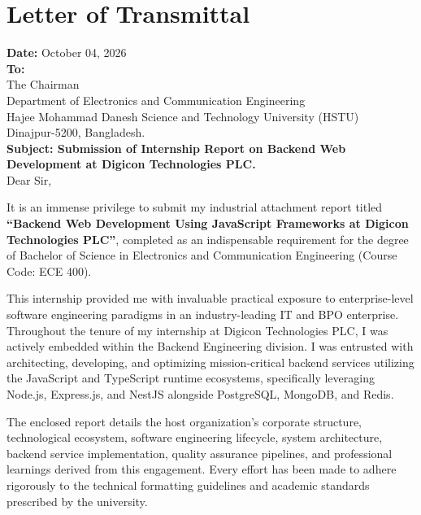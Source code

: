 \chapter*{Letter of Transmittal}

\vspace{0.5cm}
\noindent
\textbf{Date:} October 04, 2026 \\
\textbf{To:} \\
The Chairman \\
Department of Electronics and Communication Engineering \\
Hajee Mohammad Danesh Science and Technology University (HSTU) \\
Dinajpur-5200, Bangladesh. \\

\vspace{0.5cm}
\noindent
\textbf{Subject: Submission of Internship Report on Backend Web Development at Digicon Technologies PLC.} \\

\vspace{0.4cm}
\noindent
Dear Sir,

\vspace{0.2cm}
It is an immense privilege to submit my industrial attachment report titled \textbf{“Backend Web Development Using JavaScript Frameworks at Digicon Technologies PLC”}, completed as an indispensable requirement for the degree of Bachelor of Science in Electronics and Communication Engineering (Course Code: ECE 400).

This internship provided me with invaluable practical exposure to enterprise-level software engineering paradigms in an industry-leading IT and BPO enterprise. Throughout the tenure of my internship at Digicon Technologies PLC, I was actively embedded within the Backend Engineering division. I was entrusted with architecting, developing, and optimizing mission-critical backend services utilizing the JavaScript and TypeScript runtime ecosystems, specifically leveraging Node.js, Express.js, and NestJS alongside PostgreSQL, MongoDB, and Redis.

The enclosed report details the host organization's corporate structure, technological ecosystem, software engineering lifecycle, system architecture, backend service implementation, quality assurance pipelines, and professional learnings derived from this engagement. Every effort has been made to adhere rigorously to the technical formatting guidelines and academic standards prescribed by the university.

